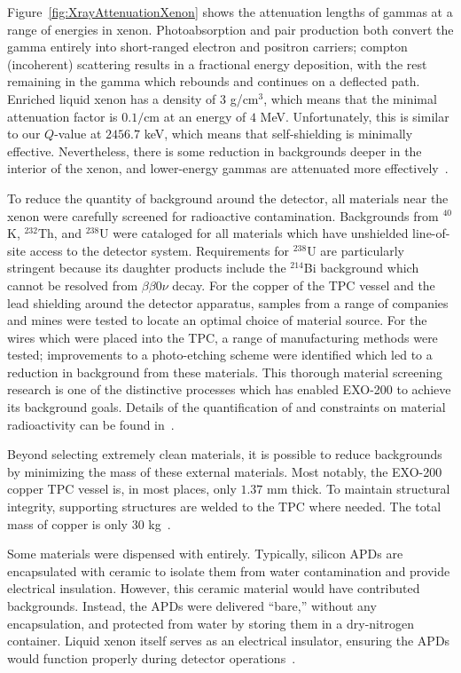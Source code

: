 Figure~\ref{fig:XrayAttenuationXenon} shows the attenuation lengths of gammas at a range of energies in xenon.  Photoabsorption and pair production both convert the gamma entirely into short-ranged electron and positron carriers; compton (incoherent) scattering results in a fractional energy deposition, with the rest remaining in the gamma which rebounds and continues on a deflected path.  Enriched liquid xenon has a density of $3$ g/cm$^3$, which means that the minimal attenuation factor is $0.1/\text{cm}$ at an energy of $4$ MeV.  Unfortunately, this is similar to our $Q$-value at $2456.7$ keV, which means that self-shielding is minimally effective.  Nevertheless, there is some reduction in backgrounds deeper in the interior of the xenon, and lower-energy gammas are attenuated more effectively~\cite{XcomXenonAttenuation}.

To reduce the quantity of background around the detector, all materials near the xenon were carefully screened for radioactive contamination.  Backgrounds from $^{40}$K, $^{232}$Th, and $^{238}$U were cataloged for all materials which have unshielded line-of-site access to the detector system.  Requirements for $^{238}$U are particularly stringent because its daughter products include the $^{214}$Bi background which cannot be resolved from $\beta\beta 0\nu$ decay.  For the copper of the TPC vessel and the lead shielding around the detector apparatus, samples from a range of companies and mines were tested to locate an optimal choice of material source.  For the wires which were placed into the TPC, a range of manufacturing methods were tested; improvements to a photo-etching scheme were identified which led to a reduction in background from these materials.  This thorough material screening research is one of the distinctive processes which has enabled EXO-200 to achieve its background goals.  Details of the quantification of and constraints on material radioactivity can be found in~\cite{MaterialsCatalog}.

Beyond selecting extremely clean materials, it is possible to reduce backgrounds by minimizing the mass of these external materials.  Most notably, the EXO-200 copper TPC vessel is, in most places, only $1.37$ mm thick. To maintain structural integrity, supporting structures are welded to the TPC where needed. The total mass of copper is only $30$ kg~\cite{detectorPartI}.

Some materials were dispensed with entirely.  Typically, silicon APDs are encapsulated with ceramic to isolate them from water contamination and provide electrical insulation.  However, this ceramic material would have contributed backgrounds.  Instead, the APDs were delivered ``bare,'' without any encapsulation, and protected from water by storing them in a dry-nitrogen container.  Liquid xenon itself serves as an electrical insulator, ensuring the APDs would function properly during detector operations~\cite{EXOLAAPD}.


